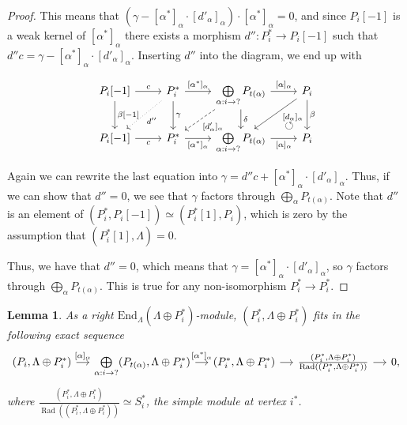 \documentclass[12pt, dvipsnames, oneside]{amsart}
\DeclareMathOperator{\Rad}{Rad}
\newtheorem{lemma}[theorem]{Lemma}
\theoremstyle{definition}
\newcommand{\End}{\text{End}}
\begin{document}
\begin{proof}
This means that $\left( \gamma - [\alpha^*]_{\alpha}\cdot[d'_\alpha]_\alpha\right)\cdot[\alpha^*]_{\alpha}=0$, and since $P_i[-1]$ is a weak kernel of $[\alpha^*]_{\alpha}$ there exists a morphism $d''\colon P_i^*\rightarrow P_i[-1]$ such that $d'' c=\gamma - [\alpha^*]_{\alpha}\cdot [d'_\alpha]_\alpha$. Inserting $d''$ into the diagram, we end up with

\begin{equation*}
\begin{tikzcd}
P_i[-1] \arrow[r, "c"] \arrow[d, "{\beta[-1]}"] & P_i^* \arrow[r, "{[\alpha^*]_{\alpha}}"] \arrow[d, "{\gamma}"] \arrow[dl, dotted, "{d''}"] & \bigoplus\limits_{\alpha:i\rightarrow ?}P_{t(\alpha)}  \arrow[r, "{[\alpha]_{\alpha}}"] \arrow[d, "{\delta}"] \arrow[dl, dashed, "{[d'_\alpha]_\alpha}"] \arrow[dr, phantom, "\circlearrowleft", near end ] & P_i \arrow[d, "{\beta}"] \arrow[dl, pos=0.4, "{[d_\alpha]_\alpha}"] \\
P_i[-1] \arrow[r, "c"'] & P_i^* \arrow[r, "{[\alpha^*]_{\alpha}}"']  & \bigoplus\limits_{\alpha:i\rightarrow ?} P_{t(\alpha)}  \arrow[r, "{[\alpha]_{\alpha}}"'] & P_i
\end{tikzcd}
\end{equation*}

Again we can rewrite the last equation into $\gamma=d'' c + [\alpha^*]_{\alpha}\cdot [d'_\alpha]_\alpha$. Thus, if we can show that $d''=0$, we see that $\gamma$ factors through $\bigoplus_{\alpha}P_{t(\alpha)}$. Note that $d''$ is an element of $(P_i^*, P_i[-1])\simeq(P_i^*[1], P_i)$, which is zero by the assumption that $(P_i^*[1], \Lambda)=0$.

 Thus, we have that $d''=0$, which means that $\gamma=[\alpha^*]_{\alpha}\cdot [d'_\alpha]_\alpha$, so $\gamma$ factors through $\bigoplus_\alpha P_{t(\alpha)}$. This is true for any non-isomorphism $P_i^*\rightarrow P_i^*$.
 
 \end{proof}


\begin{lemma}\label{lemma:HomPiLambda}
As a right $\End_\Lambda(\Lambda \oplus P_i^*)$-module, $(P_i^*, \Lambda \oplus P_i^*)$ fits in the following exact sequence
\begin{equation*}
\begin{tikzcd}[column sep = small]
(P_i,\Lambda \oplus P_i^*) \arrow[r, "{[\alpha]_{\alpha}}"] & \bigoplus\limits_{\alpha:i\rightarrow ?}(P_{t(\alpha)},\Lambda \oplus P_i^*) \arrow[r, "{[\alpha^*]_{\alpha}}"] & (P_i^*,\Lambda \oplus P_i^*) \arrow[r] & \frac{(P_i^*,\Lambda\oplus P_i^*)}{\Rad((P_i^*,\Lambda\oplus P_i^*))} \arrow[r] & 0,
\end{tikzcd}
\end{equation*}
where $\frac{(P_i^*,\Lambda\oplus P_i^*)}{\Rad((P_i^*,\Lambda\oplus P_i^*))}\simeq S_i^*$, the simple module at vertex $i^*$.
\end{lemma}
\end{document}
